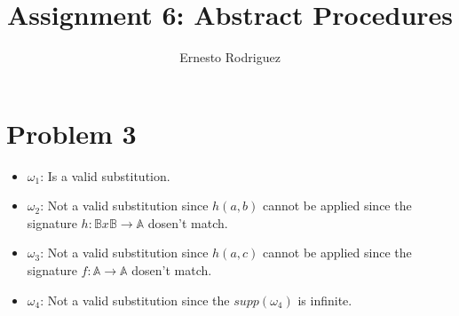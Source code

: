 \documentclass{article}
\title{Assignment 6: Abstract Procedures}
\author{Ernesto Rodriguez}
\begin{document}
\maketitle

\section{Problem 3}

\begin{itemize}
  \item{$\omega_1$: Is a valid substitution.}
  \item{$\omega_2$: Not a valid substitution since $h(a,b)$ cannot be applied since the signature $h: \mathbb{B}x\mathbb{B}\rightarrow\mathbb{A}$ dosen't match.}
  \item{$\omega_3$: Not a valid substitution since $h(a,c)$ cannot be applied since the signature $f: \mathbb{A}\rightarrow\mathbb{A}$ dosen't match.}
  \item{$\omega_4$: Not a valid substitution since the $supp(\omega_4)$ is infinite.}
\end{itemize}
\end{document}
